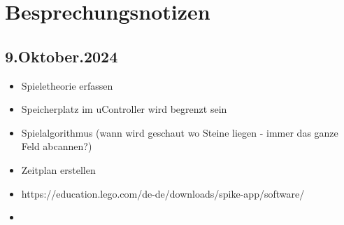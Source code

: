 \chapter*{Besprechungsnotizen}

\section{9.Oktober.2024}

\begin{itemize}
	\item Spieletheorie erfassen
	\item Speicherplatz im uController wird begrenzt sein
	\item Spielalgorithmus (wann wird geschaut wo Steine liegen - immer das ganze Feld abcannen?)
	\item Zeitplan erstellen
	\item  https://education.lego.com/de-de/downloads/spike-app/software/
	\item 
\end{itemize}
